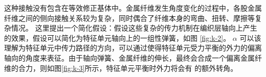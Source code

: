 这种接触没有包含在等效修正基体中。金属纤维发生角度变化的过程中，各股金属纤维之间的侧向接触关系较为复杂，同时偶合了纤维本身的弯曲、扭转、摩擦等复杂情况。
这里提出一个简化假设：假设这些复杂的传力机制在编织层轴向上产生的效果，假设可以简化为特征单元轴向上的一组性弹簧，如图 \ref{fig:k-2}。 $ \alpha $ 可以该理解为特征单元中传力路径的方向，可以通过使得特征单元受力平衡的外力的偏离轴向的角度来表征。由于轴向弹簧、金属纤维的伸长，最终会合成一个偏离金属纤维的合力，则如图\ref{fig:k-3}所示，特征单元平衡时外力将会有 的额外转角。
\begin{figure}[!htp]
\centering
	\hspace{0.5cm}
	\hspace{0.5cm}
\end{figure}
